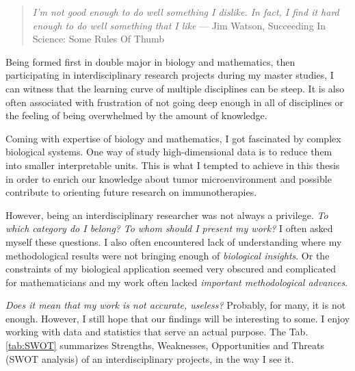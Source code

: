 \documentclass[12pt,]{book}
\theoremstyle{definition}
\theoremstyle{definition}
\theoremstyle{definition}
\theoremstyle{remark}
\begin{document}
\begin{quote}
\emph{I'm not good enough to do well something I dislike. In fact, I
find it hard enough to do well something that I like} --- Jim Watson,
Succeeding In Science: Some Rules Of Thumb \citep{Csermely2007}
\end{quote}

Being formed first in double major in biology and mathematics, then
participating in interdisciplinary research projects during my master
studies, I can witness that the learning curve of multiple disciplines
can be steep. It is also often associated with frustration of not going
deep enough in all of disciplines or the feeling of being overwhelmed by
the amount of knowledge.

Coming with expertise of biology and mathematics, I got fascinated by
complex biological systems. One way of study high-dimensional data is to
reduce them into smaller interpretable units. This is what I tempted to
achieve in this thesis in order to enrich our knowledge about tumor
microenvironment and possible contribute to orienting future research on
immunotherapies.

However, being an interdisciplinary researcher was not always a
privilege. \emph{To which category do I belong?} \emph{To whom should I
present my work?} I often asked myself these questions. I also often
encountered lack of understanding where my methodological results were
not bringing enough of \emph{biological insights}. Or the constraints of
my biological application seemed very obscured and complicated for
mathematicians and my work often lacked \emph{important methodological
advances}.

\emph{Does it mean that my work is not accurate, useless?} Probably, for
many, it is not enough. However, I still hope that our findings will be
interesting to some. I enjoy working with data and statistics that serve
an actual purpose. The Tab. \ref{tab:SWOT} summarizes Strengths,
Weaknesses, Opportunities and Threats (SWOT analysis) of an
interdisciplinary projects, in the way I see it.
\end{document}
